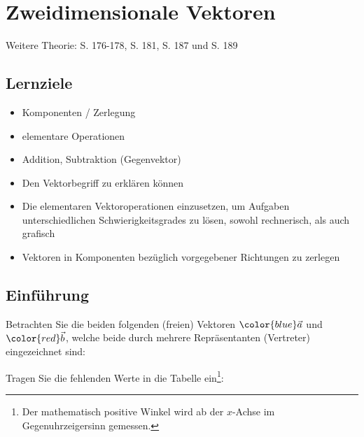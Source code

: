 
\section{Zweidimensionale Vektoren}

Weitere Theorie: S. 176-178, S. 181, S. 187 und S. 189

\subsection*{Lernziele}
\begin{itemize}
\item Komponenten / Zerlegung
\item elementare Operationen
\item Addition, Subtraktion (Gegenvektor)
\item Den Vektorbegriff zu erklären können
\item Die elementaren Vektoroperationen einzusetzen, um Aufgaben
  unterschiedlichen Schwierigkeitsgrades zu lösen, sowohl rechnerisch,
  als auch grafisch
\item Vektoren in Komponenten bezüglich vorgegebener Richtungen zu zerlegen
\end{itemize}
\newpage

\subsection{Einführung}

Betrachten Sie die beiden folgenden (freien) Vektoren ${\color{blue} \vec{a}}$ und
${\color{red}\vec{b}}$, welche beide durch mehrere Repräsentanten
(Vertreter) eingezeichnet sind:


Tragen Sie die fehlenden Werte in die Tabelle ein\footnote{Der
  mathematisch positive Winkel wird ab der $x$-Achse im
  Gegenuhrzeigersinn gemessen.}:

